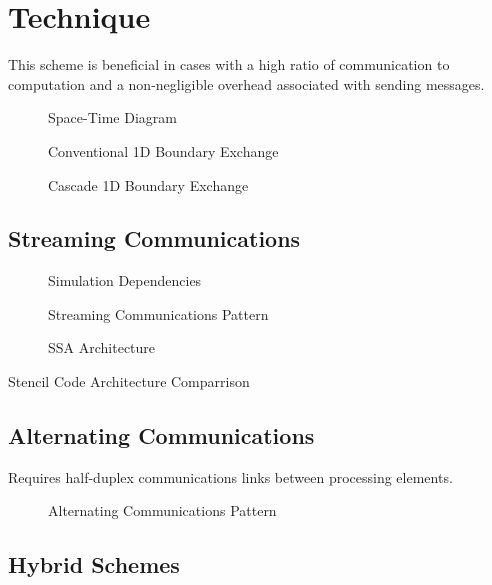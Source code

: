 \section{Technique}


This scheme is beneficial in cases with a high ratio of communication to computation and a non-negligible overhead associated with sending messages.


\begin{figure}
  \centering
  
  \caption{Space-Time Diagram}
  \label{fig:lightcone}
\end{figure}


\begin{figure}
  \centering
  
  \caption{Conventional 1D Boundary Exchange}
  \label{fig:exch1d}
\end{figure}

\begin{figure}
  \centering
  
  \caption{Cascade 1D Boundary Exchange}
  \label{fig:casc1d}
\end{figure}

\subsection{Streaming Communications}
\begin{figure}
  \centering
  
  \caption{Simulation Dependencies}
  \label{fig:simcone}
\end{figure}

\begin{figure}
  \centering
  
  \caption{Streaming Communications Pattern}
  \label{fig:streamingcomms}
\end{figure}

\begin{figure}
  \centering
  
  \caption{SSA Architecture}
  \label{fig:ssa_concept}
\end{figure}


\begin{table}
  \scriptsize
  \centering
  \caption{Stencil Code Architecture Comparrison}
  \label{tab:comparrison}
  
\end{table}

\subsection{Alternating Communications}

Requires half-duplex communications links between processing elements.
\begin{figure}
  \centering
  
  \caption{Alternating Communications Pattern}
  \label{fig:alternatingcomms}
\end{figure}


\subsection{Hybrid Schemes}

